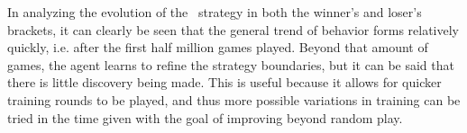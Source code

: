 


In analyzing the evolution of the \handmaxavg\ strategy in both the winner's
and loser's brackets,
it can clearly be seen that the general trend of behavior forms
relatively quickly,
i.e. after the first half million games played.
%
Beyond that amount of games,
the agent learns to refine the strategy boundaries,
but it can be said that there is little discovery being made.
%
This is useful because it allows for quicker training rounds to be played,
and thus more possible variations in training can be tried in the time given
with the goal of improving beyond random play.












